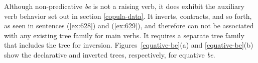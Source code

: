 Although non-predicative {\it be} is not a raising verb, it does exhibit the 
auxiliary verb behavior set out in section \ref{copula-data}.  It inverts, 
contracts, and so forth, as seen in sentences ({\ref{ex:628}}) and ({\ref{ex:629}}), and 
therefore can not be associated with any existing tree family for main verbs. 
It requires a separate tree family that includes the tree for inversion. 
Figures~\ref{equative-be}(a) and \ref{equative-be}(b) show the declarative and 
inverted trees, respectively, for equative {\it be}. 
 
\beginsentences
{}\label{ex:628} 
\label{ex:629} 
\endsentences

 
 
